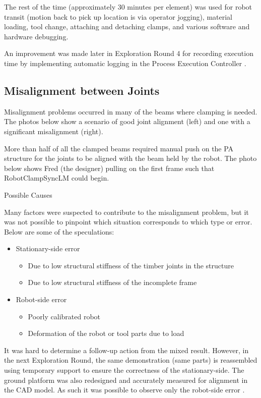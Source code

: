 The rest of the time (approximately 30 minutes per element) was used for robot transit (motion back to pick up location is via operator jogging), material loading, tool change, attaching and detaching clamps, and various software and hardware debugging. 

An improvement was made later in Exploration Round 4 for recording execution time by implementing automatic logging in the Process Execution Controller . 

\subsection{Misalignment between Joints}
\label{subsection:exploration-2-misalignment-between-joints}

Misalignment problems occurred in many of the beams where clamping is needed. The photos below show a scenario of good joint alignment (left) and one with a significant misalignment (right). 

More than half of all the clamped beams required manual push on the PA structure for the joints to be aligned with the beam held by the robot. The photo below shows Fred (the designer) pulling on the first frame such that RobotClampSyncLM could begin.

Possible Causes

Many factors were suspected to contribute to the misalignment problem, but it was not possible to pinpoint which situation corresponds to which type or error. Below are some of the speculations:
\begin{itemize}
    \item Stationary-side error
    \begin{itemize}
        \item Due to low structural stiffness of the timber joints in the structure
        \item Due to low structural stiffness of the incomplete frame
    \end{itemize}
    \item Robot-side error
    \begin{itemize}
        \item Poorly calibrated robot
        \item Deformation of the robot or tool parts due to load
    \end{itemize}
\end{itemize}

It was hard to determine a follow-up action from the mixed result. However, in the next Exploration Round, the same demonstration (same parts) is reassembled using temporary support  to ensure the correctness of the stationary-side. The ground platform was also redesigned  and accurately measured for alignment in the CAD model. As such it was possible to observe only the robot-side error .


